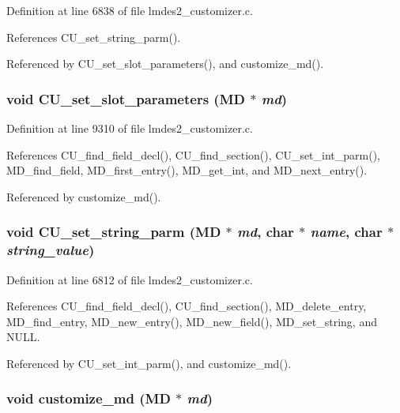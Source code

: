 Definition at line 6838 of file lmdes2\_\-customizer.c.

References CU\_\-set\_\-string\_\-parm().

Referenced by CU\_\-set\_\-slot\_\-parameters(), and customize\_\-md().
\subsubsection{\setlength{\rightskip}{0pt plus 5cm}void CU\_\-set\_\-slot\_\-parameters (\bf{MD} $\ast$ {\em md})}\label{lmdes2__customizer_8c_c9352cf521d85bfd11ab88a863ae1459}




Definition at line 9310 of file lmdes2\_\-customizer.c.

References CU\_\-find\_\-field\_\-decl(), CU\_\-find\_\-section(), CU\_\-set\_\-int\_\-parm(), MD\_\-find\_\-field, MD\_\-first\_\-entry(), MD\_\-get\_\-int, and MD\_\-next\_\-entry().

Referenced by customize\_\-md().
\subsubsection{\setlength{\rightskip}{0pt plus 5cm}void CU\_\-set\_\-string\_\-parm (\bf{MD} $\ast$ {\em md}, char $\ast$ {\em name}, char $\ast$ {\em string\_\-value})}\label{lmdes2__customizer_8c_81e61dd51203a0bd0d4756451d4b6c78}




Definition at line 6812 of file lmdes2\_\-customizer.c.

References CU\_\-find\_\-field\_\-decl(), CU\_\-find\_\-section(), MD\_\-delete\_\-entry, MD\_\-find\_\-entry, MD\_\-new\_\-entry(), MD\_\-new\_\-field(), MD\_\-set\_\-string, and NULL.

Referenced by CU\_\-set\_\-int\_\-parm(), and customize\_\-md().
\subsubsection{\setlength{\rightskip}{0pt plus 5cm}void customize\_\-md (\bf{MD} $\ast$ {\em md})}\label{lmdes2__customizer_8c_325650c03d399b4e850fe3a9bda3df17}




